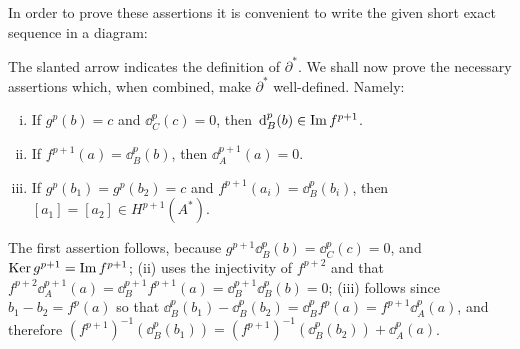 In order to prove these assertions it is convenient to write the given short exact
sequence in a diagram:


\begin{center}
\end{center}

The slanted arrow indicates the definition of $\partial^*$. We shall now prove the necessary
assertions which, when combined, make $\partial^*$ well-defined. Namely:
\begin{enumerate}[(i)]
  \item If $g^p(b) = c$  and $\dd^p_C(c) = 0$, then $\dd^p_B(b) \in\im f^{p+1}$.
  \item If $f^{p+1}(a) = \dd^p_B(b)$, then $\dd^{p+1}_A(a) = 0$.
  \item If $g^p(b_1) = g^p(b_2) = c$ and $f^{p+1}(a_i) = \dd^p_B(b_i)$, then $[a_1]=[a_2] \in H^{p+1}(A^*)$.
\end{enumerate}



The first assertion follows, because $g^{p+1}\dd^p_B(b) = \dd^p_C(c) = 0$, and $\operatorname{Ker} g^{p+1} = \operatorname{Im} f^{p+1}$;
(ii) uses the injectivity of $f^{p+2}$ and that $f^{p+2}\dd^{p+1}_A(a) = \dd^{p+1}_Bf^{p+1}(a) = \dd^{p+1}_B\dd^p_B(b) = 0$;
(iii) follows since $b_1-b_2 = f^p(a)$ so that $\dd^p_B(b_1) - \dd^p_B(b_2) = \dd^p_Bf^p(a) = f^{p+1}\dd^p_A(a)$, 
and therefore $(f^{p+1})^{-1}(\!\dd^p_B(b_1)) = (f^{p+1})^{-1} (\!\dd^p_B(b_2)) + \dd^p_A(a)$.

